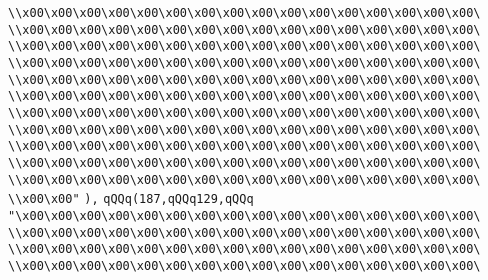 \verb|\\x00\x00\x00\x00\x00\x00\x00\x00\x00\x00\x00\x00\x00\x00\x00\x00\|\newline
\verb|\\x00\x00\x00\x00\x00\x00\x00\x00\x00\x00\x00\x00\x00\x00\x00\x00\|\newline
\verb|\\x00\x00\x00\x00\x00\x00\x00\x00\x00\x00\x00\x00\x00\x00\x00\x00\|\newline
\verb|\\x00\x00\x00\x00\x00\x00\x00\x00\x00\x00\x00\x00\x00\x00\x00\x00\|\newline
\verb|\\x00\x00\x00\x00\x00\x00\x00\x00\x00\x00\x00\x00\x00\x00\x00\x00\|\newline
\verb|\\x00\x00\x00\x00\x00\x00\x00\x00\x00\x00\x00\x00\x00\x00\x00\x00\|\newline
\verb|\\x00\x00\x00\x00\x00\x00\x00\x00\x00\x00\x00\x00\x00\x00\x00\x00\|\newline
\verb|\\x00\x00\x00\x00\x00\x00\x00\x00\x00\x00\x00\x00\x00\x00\x00\x00\|\newline
\verb|\\x00\x00\x00\x00\x00\x00\x00\x00\x00\x00\x00\x00\x00\x00\x00\x00\|\newline
\verb|\\x00\x00\x00\x00\x00\x00\x00\x00\x00\x00\x00\x00\x00\x00\x00\x00\|\newline
\verb|\\x00\x00\x00\x00\x00\x00\x00\x00\x00\x00\x00\x00\x00\x00\x00\x00\|\newline
\verb|\\x00\x00"|\newline
\verb|),|\newline
\verb|qQQq(187,qQQq129,qQQq|\newline
\verb|"\x00\x00\x00\x00\x00\x00\x00\x00\x00\x00\x00\x00\x00\x00\x00\x00\|\newline
\verb|\\x00\x00\x00\x00\x00\x00\x00\x00\x00\x00\x00\x00\x00\x00\x00\x00\|\newline
\verb|\\x00\x00\x00\x00\x00\x00\x00\x00\x00\x00\x00\x00\x00\x00\x00\x00\|\newline
\verb|\\x00\x00\x00\x00\x00\x00\x00\x00\x00\x00\x00\x00\x00\x00\x00\x00\|\newline
